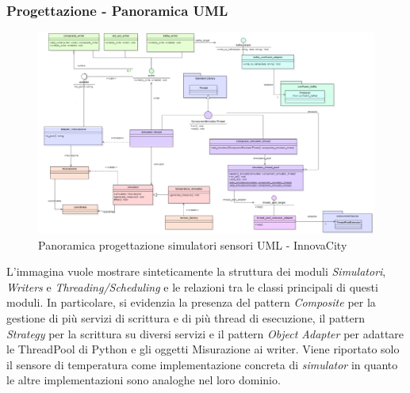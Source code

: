 \subsubsection{Progettazione - Panoramica UML }
\begin{figure}[H]
    \centering
    \includegraphics[width=1.1\textwidth]{../Images/SpecificaTecnica/progettazioneCompSimulatori.PNG}
    \caption{Panoramica progettazione simulatori sensori UML - InnovaCity}
    \label{fig: panor_sim}
\end{figure}
L'immagina vuole mostrare sinteticamente la struttura dei moduli \textit{Simulatori}, \textit{Writers} e \textit{Threading/Scheduling} e le relazioni tra le classi principali di questi moduli. In particolare, si evidenzia la presenza del pattern \textit{Composite} per la gestione di più servizi di scrittura e di più thread di esecuzione, il pattern \textit{Strategy} per la scrittura su diversi servizi e il pattern \textit{Object Adapter} per adattare le ThreadPool di Python e gli oggetti Misurazione ai writer. 
Viene riportato solo il sensore di temperatura come implementazione concreta di \textit{simulator} in quanto le altre implementazioni sono analoghe nel loro dominio.